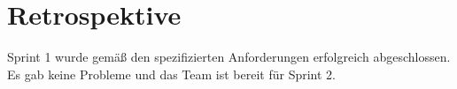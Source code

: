 \documentclass[a4paper, 11pt]{article} %
\begin{document}

\section*{Retrospektive}
Sprint 1 wurde gemäß den spezifizierten Anforderungen erfolgreich abgeschlossen. Es gab keine Probleme und das Team 
ist bereit für Sprint 2.



%

%

\end{document}
